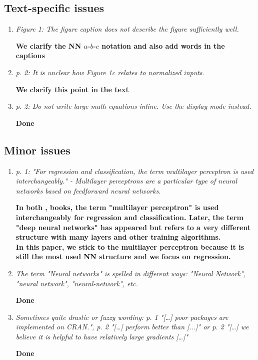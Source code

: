 \documentclass[12pt]{article}
\begin{document}
\subsection*{Text-specific issues}

\begin{enumerate}[resume]
\item \textit{Figure 1: The figure caption does not describe the figure sufficiently well.}

\textbf{We clarify the NN $a$-$b$-$c$ notation and also add words in the captions}

\item \textit{p. 2: It is unclear how Figure 1c relates to normalized inputs.}

\textbf{We clarify this point in the text}

\item \textit{p. 2: Do not write large math equations inline. Use the display mode instead.}

\textbf{Done}

\end{enumerate}

\subsection*{Minor issues}

\begin{enumerate}[resume]
\item \textit{p. 1: "For regression and classification, the term multilayer perceptron is used interchangeably." - Multilayer perceptrons are a particular type of neural networks based on feedforward neural networks.}

\textbf{In both \cite{Bishop-NNPR95},\cite{ripley2007pattern} books,
the term "multilayer perceptron" is used interchangeably for regression and classification.
Later, the term "deep neural networks" has appeared but refers to a very different
structure with many layers and other training algorithms.\\
In this paper, we stick to the multilayer perceptron because it is still the most used
NN structure and we focus on regression.}


\item \textit{The term "Neural networks" is spelled in different ways: "Neural Network", "neural network", "neural-network", etc.}

\textbf{Done}

 
\item \textit{Sometimes quite drastic or fuzzy wording: p. 1 "[…] poor packages are implemented on CRAN.", p. 2 "[…] perform better than [...]" or p. 2 "[…] we believe it is helpful to have relatively large gradients […]"}

\textbf{Done}


\end{enumerate}
\end{document}
